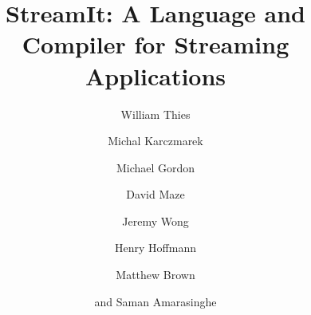 \documentclass{llncs}
\begin{document}
\pagestyle{headings}

\mainmatter

\title{StreamIt:  A Language and Compiler for Streaming Applications}


\author{William Thies \and 
Michal Karczmarek \and 
Michael Gordon \and 
David Maze \and 
Jeremy Wong \and
Henry Hoffmann \and 
Matthew Brown \and 
and Saman Amarasinghe
}






\newcommand{\ma}[2]{max_{#1 \rightarrow #2}}
\newcommand{\mal}[1]{maxloop_{#1 \rightarrow #1}}
\newcommand{\mi}[2]{min_{#1 \leftarrow #2}}

\maketitle

\begin{abstract}

\end{abstract}




%





%

\end{document}
